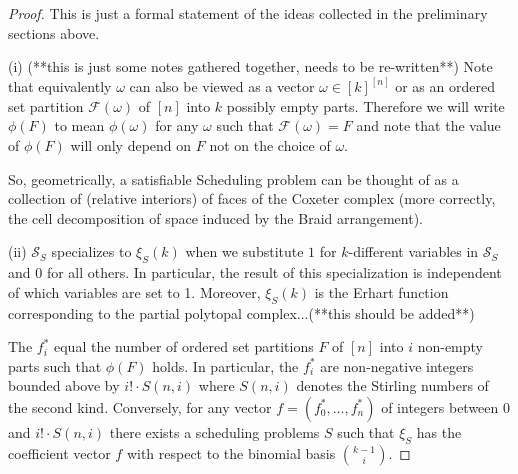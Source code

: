 \documentclass[12pt,reqno]{amsart}
\numberwithin{definition}{section}
\newcommand{\SSS}{\mathcal{S}}
\newcommand{\FFF}{\mathcal{F}}
\begin{document}
\begin{proof}

 This is just a formal statement of the ideas collected in the preliminary sections above.

(i) (**this is just some notes gathered together, needs to be re-written**) Note that
equivalently $\omega$ can also be viewed as a vector $\omega\in
[k]^{[n]}$ or as an ordered set partition $\FFF(\omega)$ of $[n]$ into
$k$ possibly empty parts. Therefore we will write $\phi(F)$ to mean
$\phi(\omega)$ for any $\omega$ such that $\FFF(\omega)=F$ and note
that the value of $\phi(F)$ will only depend on $F$ not on the choice
of $\omega$. 

So, geometrically, a satisfiable Scheduling problem can be thought of
as a collection of (relative interiors) of faces of the Coxeter
complex (more correctly, the cell decomposition of space induced by
the Braid arrangement). 


(ii) $\SSS_S$ specializes to $\xi_S(k)$ when we substitute $1$ for $k$-different variables in $\SSS_S$ and $0$ for all others. In particular, the result of this specialization is independent of which variables are set to 1. Moreover, $\xi_S(k)$ is the Erhart function corresponding to the partial polytopal complex...(**this should be added**)


The $f_i^*$ equal the number of ordered set partitions $F$ of $[n]$ into $i$ non-empty parts such that $\phi(F)$ holds. In particular, the $f_i^*$ are non-negative integers bounded above by $i!\cdot S(n,i)$ where $S(n,i)$ denotes the Stirling numbers of the second kind.  Conversely, for any vector $f=(f_0^*,\ldots,f_n^*)$ of integers between $0$ and $i!\cdot S(n,i)$ there exists a scheduling problems $S$ such that $\xi_S$ has the coefficient vector $f$ with respect to the binomial basis $\binom{k-1}{i}$.
\end{proof}
\end{document}
